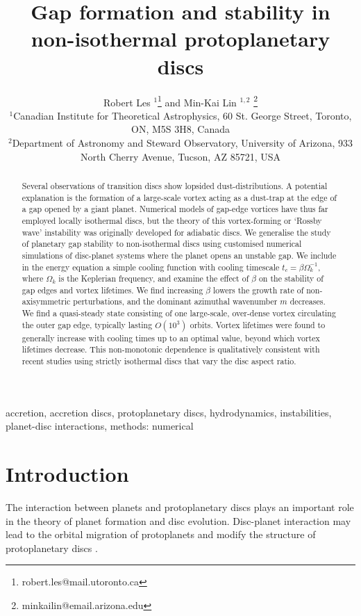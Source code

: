 \documentclass[useAMS,usenatbib]{mn2e}
\title[Gaps in non-isothermal discs]{Gap formation and stability in 
  non-isothermal protoplanetary discs}
\author[Les and Lin]{Robert Les
  $^1$\thanks{robert.les@mail.utoronto.ca} and Min-Kai Lin $^{1,2}$
  \thanks{ minkailin@email.arizona.edu} \\ 
  $^1$Canadian Institute for Theoretical Astrophysics,  
  60 St. George Street, Toronto, ON, M5S 3H8, Canada \\
  $^2$Department of Astronomy and Steward Observatory, University of
  Arizona, 933 North Cherry Avenue, Tucson, AZ 85721, USA 
}
\begin{document}
\maketitle
\begin{abstract}
  Several observations of transition discs show lopsided
  dust-distributions. A potential explanation is the formation of a
  large-scale vortex acting as a dust-trap at the edge of a gap opened
  by a giant planet. Numerical models of gap-edge vortices have
  thus far employed locally isothermal discs, but the 
  theory of this vortex-forming or `Rossby wave' instability was
  originally developed for adiabatic discs.  
  We generalise the study of planetary gap stability to non-isothermal
  discs using customised numerical simulations of disc-planet
  systems where the planet opens an unstable gap. 
  We include in the energy equation a simple cooling function with
  cooling timescale $t_c=\beta\Omega_k^{-1}$, where $\Omega_k$ is
  the Keplerian frequency, and examine the effect of $\beta$ on the
  stability of gap edges and vortex lifetimes. We find increasing
  $\beta$ lowers the growth rate of non-axisymmetric perturbations, and the
  dominant azimuthal wavenumber $m$ decreases.  
  We find a quasi-steady state consisting of one  
  large-scale, over-dense vortex circulating the outer gap edge, typically  
  lasting $O(10^3)$ orbits. 
  Vortex lifetimes were found to generally increase with cooling times up to an
  optimal value, beyond which vortex lifetimes decrease. This
  non-monotonic dependence is qualitatively consistent with 
  recent studies using strictly isothermal discs that vary the disc aspect ratio. 
\end{abstract}

\begin{keywords}
  accretion, accretion discs, protoplanetary discs, hydrodynamics, instabilities,
  planet-disc interactions, methods: numerical 
\end{keywords}


\section{Introduction}\label{intro}
The interaction between planets and protoplanetary discs plays an
important role in the theory of planet formation and disc 
evolution. Disc-planet interaction may lead to the orbital migration
of protoplanets and modify the structure of
protoplanetary discs  \citep[see][for a recent review]{baruteau13}.  
\end{document}

